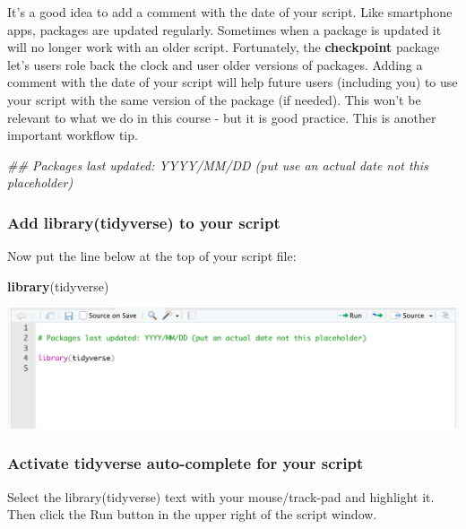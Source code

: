 \documentclass[
]{krantz}
\makeatletter
\newenvironment{Shaded}{\begin{snugshade}}{\end{snugshade}}
\newcommand{\CommentTok}[1]{\textcolor[rgb]{0.37,0.37,0.37}{\textit{#1}}}
\newcommand{\KeywordTok}[1]{\textcolor[rgb]{0.27,0.27,0.27}{\textbf{#1}}}
\newcommand{\NormalTok}[1]{#1}
\newenvironment{kframe}{%
\medskip{}
\setlength{\fboxsep}{.8em}
 \def\at@end@of@kframe{}%
 \ifinner\ifhmode%
  \def\at@end@of@kframe{\end{minipage}}%
  \begin{minipage}{\columnwidth}%
 \fi\fi%
 \def\FrameCommand##1{\hskip\@totalleftmargin \hskip-\fboxsep
 \colorbox{shadecolor}{##1}\hskip-\fboxsep
     \hskip-\linewidth \hskip-\@totalleftmargin \hskip\columnwidth}%
 \MakeFramed {\advance\hsize-\width
   \@totalleftmargin\z@ \linewidth\hsize
   \@setminipage}}%
 {\par\unskip\endMakeFramed%
 \at@end@of@kframe}
\renewenvironment{Shaded}{\begin{kframe}}{\end{kframe}}
\makeatother
\begin{document}
It's a good idea to add a comment with the date of your script. Like smartphone apps, packages are updated regularly. Sometimes when a package is updated it will no longer work with an older script. Fortunately, the \textbf{checkpoint} package let's users role back the clock and user older versions of packages. Adding a comment with the date of your script will help future users (including you) to use your script with the same version of the package (if needed). This won't be relevant to what we do in this course - but it is good practice. This is another important workflow tip.

\begin{Shaded}
\begin{Highlighting}[]
\CommentTok{## Packages last updated: YYYY/MM/DD (put use an actual date not this placeholder)}
\end{Highlighting}
\end{Shaded}

\hypertarget{add-librarytidyverse-to-your-script}{%
\subsubsection{Add library(tidyverse) to your script}\label{add-librarytidyverse-to-your-script}}

Now put the line below at the top of your script file:

\begin{Shaded}
\begin{Highlighting}[]
\KeywordTok{library}\NormalTok{(tidyverse)}
\end{Highlighting}
\end{Shaded}

\includegraphics[width=0.5\linewidth,height=0.5\textheight]{first_time/images/script_tidyverse}

\hypertarget{activate-tidyverse-auto-complete-for-your-script}{%
\subsubsection{Activate tidyverse auto-complete for your script}\label{activate-tidyverse-auto-complete-for-your-script}}

Select the library(tidyverse) text with your mouse/track-pad and highlight it. Then click the Run button in the upper right of the script window.
\end{document}
